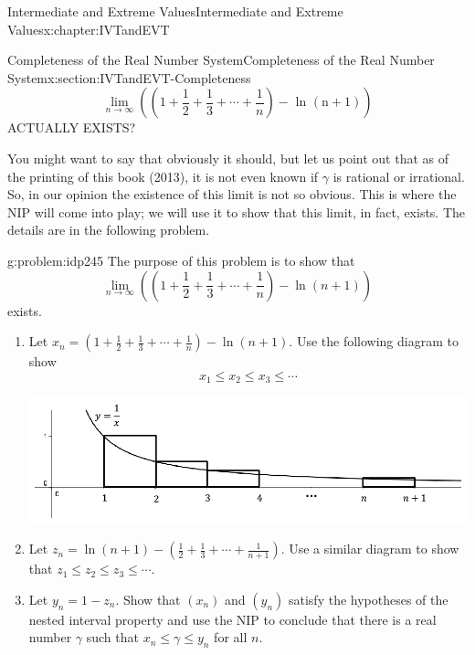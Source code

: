 \begin{chapterptx}{Intermediate and Extreme Values}{}{Intermediate and Extreme Values}{}{}{x:chapter:IVTandEVT}
\begin{sectionptx}{Completeness of the Real Number System}{}{Completeness of the Real Number System}{}{}{x:section:IVTandEVT-Completeness}
\begin{equation*}
			\lim_{n\rightarrow\infty}\left(\left(1+\frac{1}{2}+\frac{1}{3}+\cdots+\frac{1}{n}\right)-\text{ ln } \left(\text{n} +1\right)\right)
		\end{equation*}
		\alert{ACTUALLY EXISTS?}%
		\par
		You might want to say that obviously it should, but let us point out that as of the printing of this book (2013), it is not even known if \(\gamma\) is rational or irrational. So, in our opinion the existence of this limit is not so obvious. This is where the NIP will come into play; we will use it to show that this limit, in fact, exists. The details are in the following problem.%
		\begin{problem}{}{g:problem:idp245}%
			The purpose of this problem is to show that%
			\begin{equation*}
				\lim_{n\rightarrow\infty}\left(\left(1+\frac{1}{2}+\frac{1}{3}+\cdots+ \frac{1}{n}\right)-\ln\left(n+1\right)\right)
			\end{equation*}
			exists.%
			\begin{enumerate}[font=\bfseries,label=(\alph*),ref=\alph*]
				\item{}Let \(x_n=\left(1+\frac{1}{2}+\frac{1}{3}+\cdots+\frac{1}{n}\right)-\ln\left(n+1 \right)\). Use the following diagram to show%
				\begin{equation*}
					x_1\leq x_2\leq x_3\leq\cdots
				\end{equation*}
				\begin{image}{0.08}{0.84}{0.08}%
					\includegraphics[width=\linewidth]{external/images/Ch6fig7.png}
				\end{image}%
				\item{}Let \(z_n=\ln\left(n+1\right)-\left(\frac{1}{2}+\frac{1}{3}+\cdots+\frac{1}{n+1} \right)\). Use a similar diagram to show that \(z_1\leq z_2\leq z_3\leq\cdots\).%
				\item{}Let \(y_n=1-z_n\).  Show that \(\left(x_n\right)\) and \(\left(y_n\right)\) satisfy the hypotheses of the nested interval property and use the NIP to conclude that there is a real number \(\gamma\) such that \(x_n\leq\gamma\leq
				y_n\) for all \(n\).%

\end{enumerate}
\end{problem}
\end{sectionptx}
\end{chapterptx}
